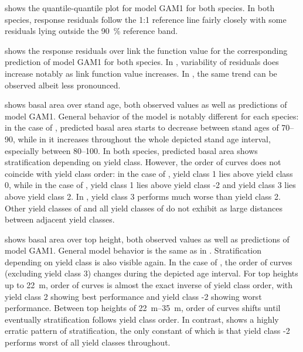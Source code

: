  shows the quantile-quantile plot for model GAM1 for both species.  In both species, response residuals follow the 1:1 reference line fairly closely with some residuals lying outside the \SI{90}{\percent} reference band.

 shows the response residuals over link the function value for the corresponding prediction of model GAM1 for both species.  In \Beech{}, variability of residuals does increase notably as link function value increases.  In \Spruce{}, the same trend can be observed albeit less pronounced.

 shows basal area over stand age, both observed values as well as predictions of model GAM1.  General behavior of the model is notably different for each species:  in the case of \Beech{}, predicted basal area starts to decrease between stand ages of \SIrange{70}{90}{\year}, while in \Spruce{} it increases throughout the whole depicted stand age interval, especially between \SIrange{80}{100}{\year}.  In both species, predicted basal area shows stratification depending on yield class.  However, the order of curves does not coincide with yield class order:  in the case of \Beech{}, yield class 1 lies above yield class 0, while in the case of \Spruce{}, yield class 1 lies above yield class -2 and yield class 3 lies above yield class 2.  In \Beech{}, yield class 3 performs much worse than yield class 2.  Other yield classes of \Beech{} and all yield classes of \Spruce{} do not exhibit as large distances between adjacent yield classes. 

 shows basal area over top height, both observed values as well as predictions of model GAM1.  General model behavior is the same as in .  Stratification depending on yield class is also visible again.  In the case of \Beech{}, the order of curves (excluding yield class 3) changes during the depicted age interval.  For top heights up to \SI{22}{\meter}, order of curves is almost the exact inverse of yield class order, with yield class 2 showing best performance and yield class -2 showing worst performance.  Between top heights of \SIrange{22}{35}{\meter}, order of curves shifts until eventually stratification follows yield class order.  In contrast, \Spruce{} shows a highly erratic pattern of stratification, the only constant of which is that yield class -2 performs worst of all yield classes throughout.

